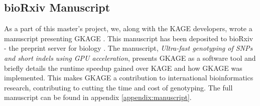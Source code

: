 \subsection{bioRxiv Manuscript}
As a part of this master's project, we, along with the KAGE developers, wrote a manuscript presenting GKAGE \cite{manuscript}.
This manuscript has been deposited to bioRxiv - the preprint server for biology \cite{biorxiv}.
The manuscript, \textit{Ultra-fast genotyping of SNPs and short indels using GPU acceleration}, presents GKAGE as a software tool and briefly details the runtime speedup gained over KAGE and how GKAGE was implemented.
This makes GKAGE a contribution to international bioinformatics research, contributing to cutting the time and cost of genotyping.
The full manuscript can be found in appendix \ref{appendix:manuscript}.
